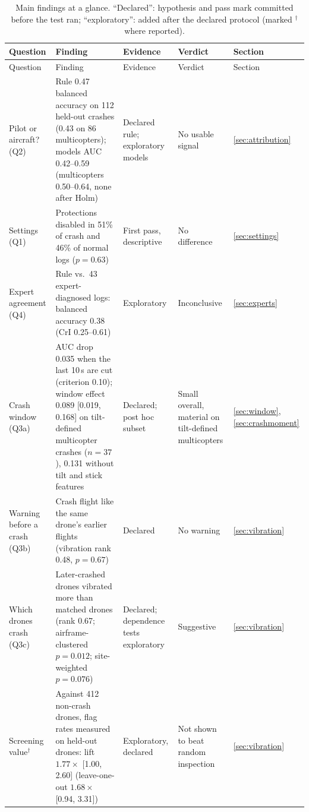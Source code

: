 \documentclass[preprint,12pt]{elsarticle}
\begin{document}
{\footnotesize
\begin{longtable}{@{}>{\raggedright\arraybackslash}p{}>{\raggedright\arraybackslash}p{}>{\raggedright\arraybackslash}p{}>{\raggedright\arraybackslash}p{}>{\raggedright\arraybackslash}p{}@{}}
\caption{Main findings at a glance. ``Declared'': hypothesis and pass mark committed before the test ran; ``exploratory'': added after the declared protocol (marked $^\dagger$ where reported).}
\label{tab:summary}\\
\toprule
Question & Finding & Evidence & Verdict & Section \\
\midrule
\endfirsthead
\toprule
Question & Finding & Evidence & Verdict & Section \\
\midrule
\endhead
\bottomrule
\endlastfoot
Pilot or aircraft? (Q2) & Rule 0.47 balanced accuracy on 112 held-out crashes (0.43 on 86 multicopters); models AUC 0.42--0.59 (multicopters 0.50--0.64, none after Holm) & Declared rule; exploratory models & No usable signal & \ref{sec:attribution} \\
Settings (Q1) & Protections disabled in 51\% of crash and 46\% of normal logs ($p=0.63$) & First pass, descriptive & No difference & \ref{sec:settings} \\
Expert agreement (Q4) & Rule vs.\ 43 expert-diagnosed logs: balanced accuracy 0.38 (CrI 0.25--0.61) & Exploratory & Inconclusive & \ref{sec:experts} \\
Crash window (Q3a) & AUC drop 0.035 when the last 10\,s are cut (criterion 0.10); window effect 0.089 [0.019, 0.168] on tilt-defined multicopter crashes ($n=37$), 0.131 without tilt and stick features & Declared; post hoc subset & Small overall, material on tilt-defined multicopters & \ref{sec:window}, \ref{sec:crashmoment} \\
Warning before a crash (Q3b) & Crash flight like the same drone's earlier flights (vibration rank 0.48, $p=0.67$) & Declared & No warning & \ref{sec:vibration} \\
Which drones crash (Q3c) & Later-crashed drones vibrated more than matched drones (rank 0.67; airframe-clustered $p=0.012$; site-weighted $p=0.076$) & Declared; dependence tests exploratory & Suggestive & \ref{sec:vibration} \\
Screening value$^\dagger$ & Against 412 non-crash drones, flag rates measured on held-out drones: lift $1.77\times$ [1.00, 2.60] (leave-one-out $1.68\times$ [0.94, 3.31]) & Exploratory, declared & Not shown to beat random inspection & \ref{sec:vibration} \\

\end{longtable}}
\end{document}
